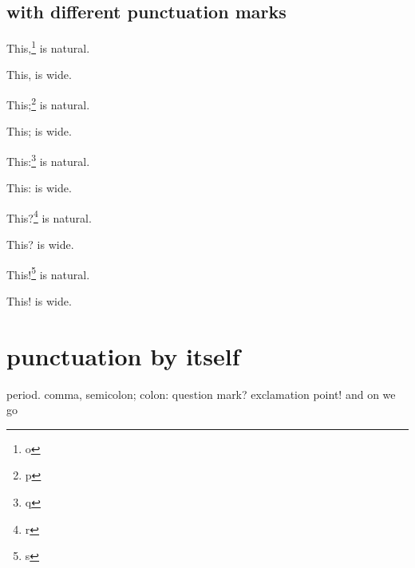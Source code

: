 \documentclass{snapshotmfo}
\begin{document}
\subsection{with different punctuation marks}

\noindent This,\footnote{o} is natural.

\noindent This, is wide.

\noindent This;\footnote{p} is natural.

\noindent This; is wide.

\noindent This:\footnote{q} is natural.

\noindent This: is wide.

\noindent This?\footnote{r} is natural.

\noindent This? is wide.

\noindent This!\footnote{s} is natural.

\noindent This! is wide.


\section{punctuation by itself} 

period. comma, semicolon; colon: question mark? exclamation point! and on we go
\end{document}
